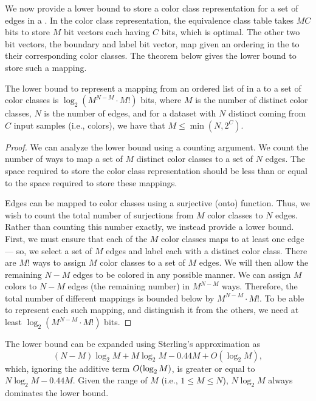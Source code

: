 We now provide a lower bound to store a color class representation for a set of
edges in a \cdbg. In the color class representation, the equivalence class table
takes $MC$ bits to store $M$ bit vectors each having $C$ bits, which is
optimal. The other two bit vectors, the boundary and label bit vector, map \kmers
given an ordering in the \dbg to their corresponding color classes. The theorem
below gives the lower bound to store such a mapping.
 
\begin{theorem}
%
  The lower bound to represent a mapping from an ordered list of \kmers in a
  \dbg to a set of color classes is $\log_2{(M^{N-M} \cdot M!)}$ bits, where
  $M$ is the number of distinct color classes, $N$ is the number of edges, and
  for a dataset with $N$ distinct \kmers coming from $C$ input samples (i.e.,
  colors), we have that $M \leq \min(N,2^C)$.
%
\end{theorem}

\begin{proof}

We can analyze the lower bound using a counting argument. We count the number
of ways to map a set of $M$ distinct color classes to a set of $N$ edges. The
space required to store the color class representation should be less than or
equal to the space required to store these mappings.

Edges can be mapped to color classes using a surjective (onto) function. Thus,
we wish to count the total number of surjections from $M$ color classes to $N$
edges. Rather than counting this number exactly, we instead provide a lower bound.
First, we must ensure that each of the $M$ color classes maps to at least one
edge --- so, we select a set of $M$ edges and label each with a distinct color
class. There are $M!$ ways to assign $M$ color classes to a set of $M$ edges. We
will then allow the remaining $N-M$ edges to be colored in any possible manner.
We can assign $M$ colors to $N-M$ edges (the remaining number) in $M^{N-M}$
ways. Therefore, the total number of different mappings is bounded below by $M^{N-M}
\cdot M!$. To be able to represent each such mapping, and distinguish it from
the others, we need at least $\log_2{(M^{N-M} \cdot M!)}$ bits.
\end{proof}

The lower bound can be expanded using Sterling's approximation as
\[
(N-M)\log_2{M} + M\log_2{M} - 0.44M + O(\log_2{M}),
\]
which, ignoring the
additive term $O(\log_2{M})$, is greater or equal to $N\log_2{M} - 0.44M$. Given the range of
$M$ (i.e., $1 \leq M \leq N$), $N\log_2{M}$ always dominates the lower bound.

